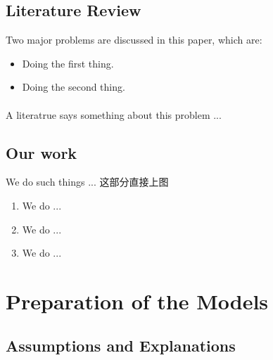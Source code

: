 \documentclass[12pt]{ctexart}
\newcommand{\upcite}[1]{\textsuperscript{\textsuperscript{\cite{#1}}}}%
\begin{document}
\subsection{Literature Review} %
Two major problems are discussed in this paper, which are:
\begin{itemize}
	\item Doing the first thing.
	\item Doing the second thing.
\end{itemize}
A literatrue\upcite{1} says something about this problem ...



\subsection{Our work}%
We do such things ...
这部分直接上图

\begin{enumerate}[\bfseries 1.]
	\item We do ...
	\item We do ...
	\item We do ...
\end{enumerate}
\section{Preparation of the Models}
\subsection{Assumptions and Explanations}
\end{document}
